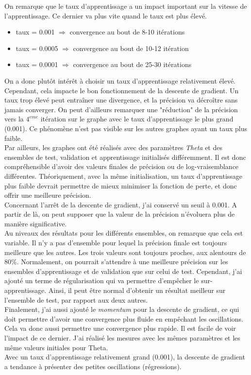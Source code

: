 \documentclass[12pt]{article}
\begin{document}
On remarque que le taux d'apprentissage a un impact important sur la vitesse de l'apprentissage. Ce dernier va plus vite quand le taux est plus élevé.
\begin{itemize}
\item taux = 0.001 $\Rightarrow$ convergence au bout de 8-10 itérations
\item taux = 0.0005 $\Rightarrow$ convergence au bout de 10-12 itération
\item taux = 0.0001 $\Rightarrow$ convergence au bout de 25-30 itérations
\end{itemize}
On a donc plutôt intérêt à choisir un taux d'apprentissage relativement élevé. Cependant, cela impacte le bon fonctionnement de la descente de gradient. Un taux trop élevé peut entraîner une divergence, et la précision va décroître sans jamais converger. On peut d'ailleurs remarquer une "réduction" de la précision vers la $4^{eme}$ itération sur le graphe avec le taux d'apprentissage le plus grand (0.001). Ce phénomène n'est pas visible sur les autres graphes ayant un taux plus faible.
\\ \linebreak
Par ailleurs, les graphes ont été réalisés avec des paramètres \textit{Theta} et des ensembles de test, validation et apprentissage initialisés différemment. Il est donc compréhensible d'avoir des valeurs finales de précision ou de log-vraisemblance différentes. Théoriquement, avec la même initialisation, un taux d'apprentissage plus faible devrait permettre de mieux minimiser la fonction de perte, et donc offrir une meilleure précision.
\\
Concernant l'arrêt de la descente de gradient, j'ai conservé un seuil à 0.001. A partir de là, on peut supposer que la valeur de la précision n'évoluera plus de manière significative.
\\ \linebreak
Au niveaux des résultats pour les différents ensembles, on remarque que cela est variable. Il n'y a pas d'ensemble pour lequel la précision finale est toujours meilleure que les autres. Les trois valeurs sont toujours proches, aux alentours de 80\%. Normalement, on pourrait s'attendre à une meilleure précision sur les ensembles d'apprentissage et de validation que sur celui de test. Cependant, j'ai ajouté un terme de régularisation qui va permettre d'empêcher le sur-apprentissage. Ainsi, il peut être normal d'obtenir un résultat meilleur sur l'ensemble de test, par rapport aux deux autres.
\\ \linebreak
Finalement, j'ai aussi ajouté le \textit{momentum} pour la descente de gradient, ce qui doit permettre d'avoir une convergence plus fluide en empêchant les oscillations. Cela va donc aussi permettre une convergence plus rapide.
Il est facile de voir l'impact de ce dernier. J'ai réalisé les mesures avec les mêmes paramètres et les même valeurs initiales pour Theta. \\ Avec un taux d'apprentissage relativement grand (0.001), la descente de gradient a tendance à présenter des petites oscillations (régressions).
\end{document}
